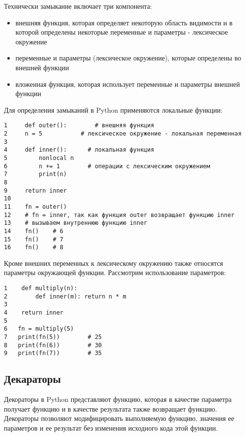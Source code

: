 \documentclass[12pt, a4paper]{article}
\begin{document}
\vspace{1em}

Технически замыкание включает три компонента:

\begin{itemize}
    \item внешняя функция, которая определяет некоторую область видимости и в которой определены некоторые переменные и параметры - лексическое окружение
    \item переменные и параметры (лексическое окружение), которые определены во внешней функции
    \item вложенная функция, которая использует переменные и параметры внешней функции
\end{itemize}

\newpage

Для определения замыканий в Python применяются локальные функции:

\begin{verbatim}
1     def outer():        # внешняя функция
2     n = 5           # лексическое окружение - локальная переменная
3  
4     def inner():      # локальная функция
5         nonlocal n
6         n += 1        # операции с лексическим окружением
7         print(n)
8  
9     return inner 
10 
11    fn = outer()   
12    # fn = inner, так как функция outer возвращает функцию inner
13    # вызываем внутреннюю функцию inner
14    fn()    # 6
15    fn()    # 7
16    fn()    # 8
\end{verbatim}

Кроме внешних переменных к лексическому окружению также относятся параметры окружающей функции. Рассмотрим использование параметров:

\begin{verbatim}
1    def multiply(n):
2        def inner(m): return n * m
3 
4    return inner
5 
6   fn = multiply(5)
7   print(fn(5))        # 25
8   print(fn(6))        # 30
9   print(fn(7))        # 35
\end{verbatim}

\subsection{Декараторы}

Декораторы в Python представляют функцию, которая в качестве параметра получает функцию и в качестве результата также возвращает функцию. Декораторы позволяют модифицировать выполняемую функцию, значения ее параметров и ее результат без изменения исходного кода этой функции.
\end{document}
